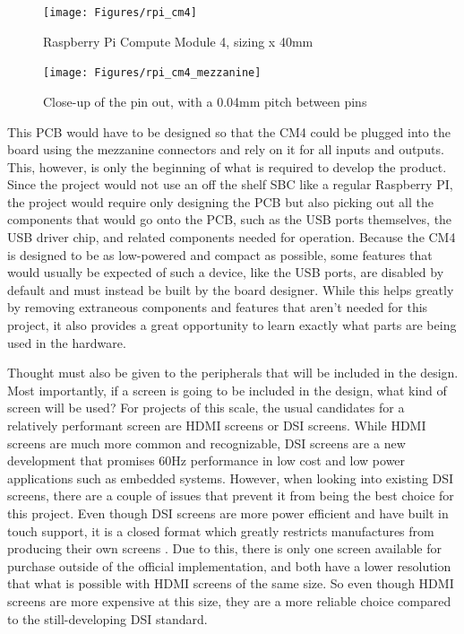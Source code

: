 \begin{figure}[h]
  \centering
  \begin{minipage}{0.45\textwidth}
    \centering
    \texttt{[image: Figures/rpi\_cm4]}
    \captionsetup{width=.75\linewidth}
    \caption[Raspberry Pi Compute Module 4]{Raspberry Pi Compute Module 4, sizing x 40mm}
    \label{fig:rpi_cm4}
  \end{minipage}\hfill
  \begin{minipage}{0.45\textwidth}
    \centering
    \texttt{[image: Figures/rpi\_cm4\_mezzanine]}
    \captionsetup{width=.75\linewidth}
    \caption[Raspberry Pi Compute Module 4 Pin out]{Close-up of the pin out, with a 0.04mm pitch between pins}
    \label{fig:rpi_cm4_mezzanine}
  \end{minipage}
\end{figure}

This PCB would have to be designed so that the CM4 could be plugged into the board using the mezzanine connectors and rely on it for all inputs and outputs.
This, however, is only the beginning of what is required to develop the product.
Since the project would not use an off the shelf SBC like a regular Raspberry PI, the project would require only designing the PCB but also picking out all the components that would go onto the PCB, such as the USB ports themselves, the USB driver chip, and related components needed for operation.
Because the CM4 is designed to be as low-powered and compact as possible, some features that would usually be expected of such a device, like the USB ports, are disabled by default and must instead be built by the board designer.
While this helps greatly by removing extraneous components and features that aren't needed for this project, it also provides a great opportunity to learn exactly what parts are being used in the hardware.

Thought must also be given to the peripherals that will be included in the design.
Most importantly, if a screen is going to be included in the design, what kind of screen will be used?
For projects of this scale, the usual candidates for a relatively performant screen are HDMI screens or DSI screens.
While HDMI screens are much more common and recognizable, DSI screens are a new development that promises 60Hz performance in low cost and low power applications such as embedded systems.
However, when looking into existing DSI screens, there are a couple of issues that prevent it from being the best choice for this project.
Even though DSI screens are more power efficient and have built in touch support, it is a closed format which greatly restricts manufactures from producing their own screens \cite{dsi_vs_hdmi}.
Due to this, there is only one screen available for purchase outside of the official implementation, and both have a lower resolution that what is possible with HDMI screens of the same size.
So even though HDMI screens are more expensive at this size, they are a more reliable choice compared to the still-developing DSI standard.

